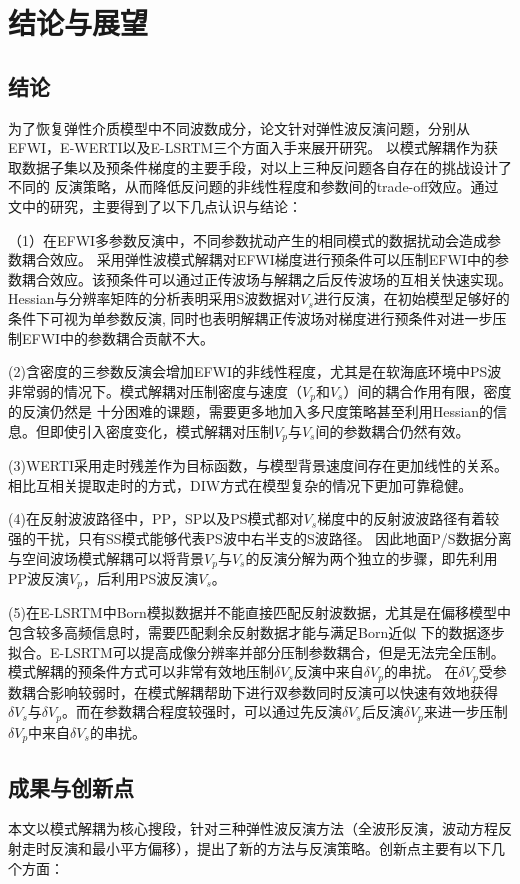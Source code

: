 \chapter{结论与展望}
\section{结论}
为了恢复弹性介质模型中不同波数成分，论文针对弹性波反演问题，分别从EFWI，E-WERTI以及E-LSRTM三个方面入手来展开研究。
以模式解耦作为获取数据子集以及预条件梯度的主要手段，对以上三种反问题各自存在的挑战设计了不同的
反演策略，从而降低反问题的非线性程度和参数间的trade-off效应。通过文中的研究，主要得到了以下几点认识与结论：

（1）在EFWI多参数反演中，不同参数扰动产生的相同模式的数据扰动会造成参数耦合效应。
采用弹性波模式解耦对EFWI梯度进行预条件可以压制EFWI中的参数耦合效应。该预条件可以通过正传波场与解耦之后反传波场的互相关快速实现。
Hessian与分辨率矩阵的分析表明采用S波数据对$V_s$进行反演，在初始模型足够好的条件下可视为单参数反演,
同时也表明解耦正传波场对梯度进行预条件对进一步压制EFWI中的参数耦合贡献不大。

(2)含密度的三参数反演会增加EFWI的非线性程度，尤其是在软海底环境中PS波非常弱的情况下。模式解耦对压制密度与速度（$V_p$和$V_s$）间的耦合作用有限，密度的反演仍然是
十分困难的课题，需要更多地加入多尺度策略甚至利用Hessian的信息。但即使引入密度变化，模式解耦对压制$V_p$与$V_s$间的参数耦合仍然有效。

(3)WERTI采用走时残差作为目标函数，与模型背景速度间存在更加线性的关系。相比互相关提取走时的方式，DIW方式在模型复杂的情况下更加可靠稳健。

(4)在反射波波路径中，PP，SP以及PS模式都对$V_s$梯度中的反射波波路径有着较强的干扰，只有SS模式能够代表PS波中右半支的S波路径。
因此地面P/S数据分离与空间波场模式解耦可以将背景$V_p$与$V_s$的反演分解为两个独立的步骤，即先利用PP波反演$V_p$，后利用PS波反演$V_s$。

(5)在E-LSRTM中Born模拟数据并不能直接匹配反射波数据，尤其是在偏移模型中包含较多高频信息时，需要匹配剩余反射数据才能与满足Born近似
下的数据逐步拟合。E-LSRTM可以提高成像分辨率并部分压制参数耦合，但是无法完全压制。模式解耦的预条件方式可以非常有效地压制$\delta
V_s$反演中来自$\delta V_p$的串扰。
在$\delta V_p$受参数耦合影响较弱时，在模式解耦帮助下进行双参数同时反演可以快速有效地获得$\delta
V_s$与$\delta V_p$。而在参数耦合程度较强时，可以通过先反演$\delta V_s$后反演$\delta
V_p$来进一步压制$\delta V_p$中来自$\delta V_s$的串扰。
\section{成果与创新点}
本文以模式解耦为核心搜段，针对三种弹性波反演方法（全波形反演，波动方程反射走时反演和最小平方偏移），提出了新的方法与反演策略。创新点主要有以下几个方面：

